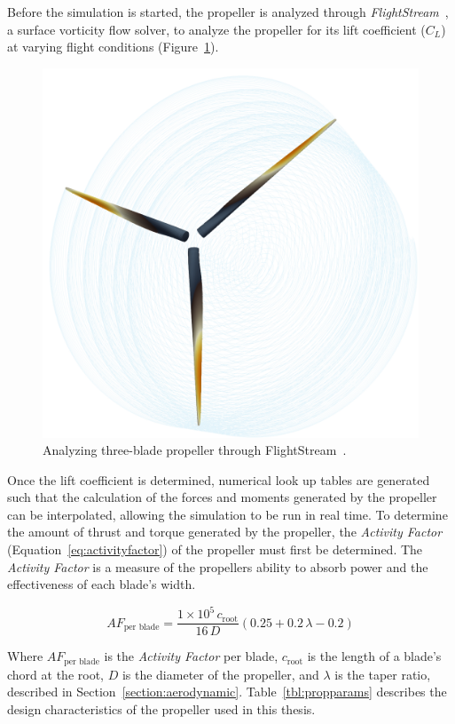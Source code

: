 Before the simulation is started, the propeller is analyzed through \textit{FlightStream}~\cite{FlightStream2022}, a surface vorticity flow solver, to analyze the propeller for its lift coefficient (\(C_L\)) at varying flight conditions (Figure~\ref{fig:flightstreamprop}).

\begin{figure}[!ht]\label{fig:flightstreamprop}
    \centering
    \includegraphics[width=.35\linewidth]{Figures/flightstreamprop.png}
    \caption{Analyzing three-blade propeller through FlightStream~\cite{FlightStream2022}.}
\end{figure}

Once the lift coefficient is determined, numerical look up tables are generated such that the calculation of the forces and moments generated by the propeller can be interpolated, allowing the simulation to be run in real time. To determine the amount of thrust and torque generated by the propeller, the \textit{Activity Factor} (Equation~\ref{eq:activityfactor}) of the propeller must first be determined. The \textit{Activity Factor} is a measure of the propellers ability to absorb power and the effectiveness of each blade's width.

\begin{equation}\label{eq:activityfactor}
    AF_{\textrm{per blade}} = \frac{1 \times 10^5 \, c_{\textrm{root}}}{16 \, D} \left(0.25 + 0.2 \, \lambda - 0.2 \right)
\end{equation}

Where \(AF_{\textrm{per blade}}\) is the \textit{Activity Factor} per blade, \(c_{\textrm{root}}\) is the length of a blade's chord at the root, \(D\) is the diameter of the propeller, and \( \lambda \) is the taper ratio, described in Section~\ref{section:aerodynamic}. Table~\ref{tbl:propparams} describes the design characteristics of the propeller used in this thesis.

